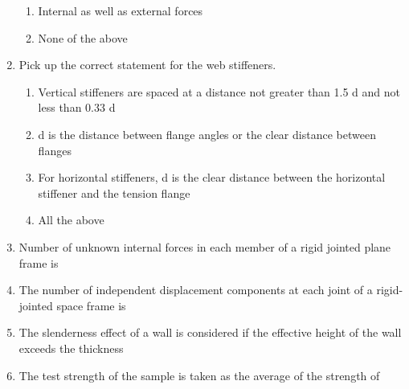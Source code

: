 \documentclass[11pt,a4paper]{article}
\begin{document}
\begin{enumerate}
\begin{enumerate}[label=\Alph*.]
\item{Internal as well as external forces}
\item{None of the above}
\end{enumerate}
\item{Pick up the correct statement for the web stiffeners.}
\begin{enumerate}[label=\Alph*.]
\item{Vertical stiffeners are spaced at a distance not greater than 1.5 d and not less than 0.33 d}
\item{d is the distance between flange angles or the clear distance between flanges}
\item{For horizontal stiffeners, d is the clear distance between the horizontal stiffener and the tension flange}
\item{All the above}
\end{enumerate}
\item{Number of unknown internal forces in each member of a rigid jointed plane frame is}
\\
\item{The number of independent displacement components at each joint of a rigid-jointed space frame is}
\\
\item{The slenderness effect of a wall is considered if the effective height of the wall exceeds the thickness}
\\
\item{The test strength of the sample is taken as the average of the strength of}

\end{enumerate}
\end{document}
